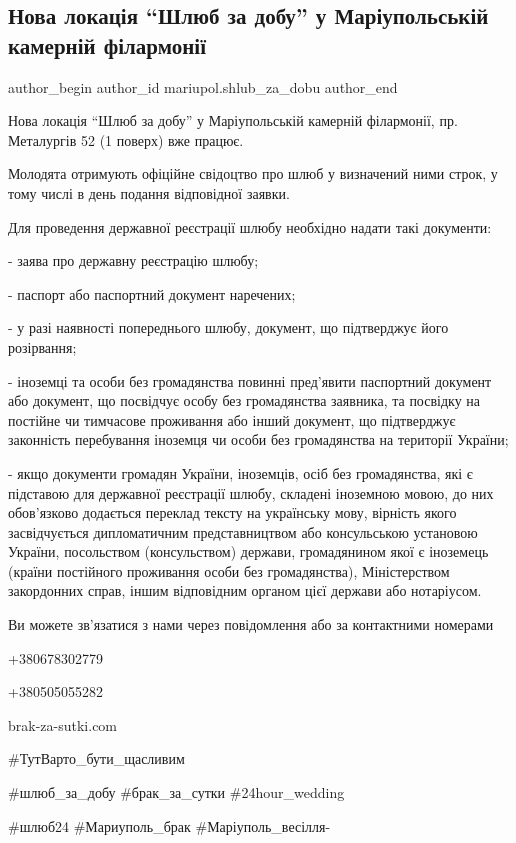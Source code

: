  
 
 
 
 

\subsection{Нова локація \enquote{Шлюб за добу} у Маріупольській камерній філармонії}
\label{sec:12_10_2021.fb.mariupol.shlub_za_dobu.1.nova_lokacia_shlub_za_dobu_filarmonia}

\ifcmt
 author_begin
   author_id mariupol.shlub_za_dobu
 author_end
\fi

Нова локація \enquote{Шлюб за добу} у Маріупольській камерній філармонії, пр.
Металургів 52 (1 поверх) вже працює.

Молодята отримують офіційне свідоцтво про шлюб у визначений ними строк, у тому
числі в день подання відповідної заявки.

Для проведення державної реєстрації шлюбу необхідно надати такі документи:

- заява про державну реєстрацію шлюбу;

- паспорт або паспортний документ наречених;

- у разі наявності попереднього шлюбу, документ, що підтверджує його розірвання;

- іноземці та особи без громадянства повинні пред'явити паспортний документ або
документ, що посвідчує особу без громадянства заявника, та посвідку на постійне
чи тимчасове проживання або інший документ, що підтверджує законність
перебування іноземця чи особи без громадянства на території України;

- якщо документи громадян України, іноземців, осіб без громадянства, які є
підставою для державної реєстрації шлюбу, складені іноземною мовою, до них
обов'язково додається переклад тексту на українську мову, вірність якого
засвідчується дипломатичним представництвом або консульською установою України,
посольством (консульством) держави, громадянином якої є іноземець (країни
постійного проживання особи без громадянства), Міністерством закордонних справ,
іншим відповідним органом цієї держави або нотаріусом.

Ви можете зв'язатися з нами через повідомлення або за контактними номерами

+380678302779\par
+380505055282

brak-za-sutki.com

\#ТутВарто\_бути\_щасливим 

\#шлюб\_за\_добу \#брак\_за\_сутки \#24hour\_wedding 

\#шлюб24 \#Мариуполь\_брак \#Маріуполь\_весілля-
